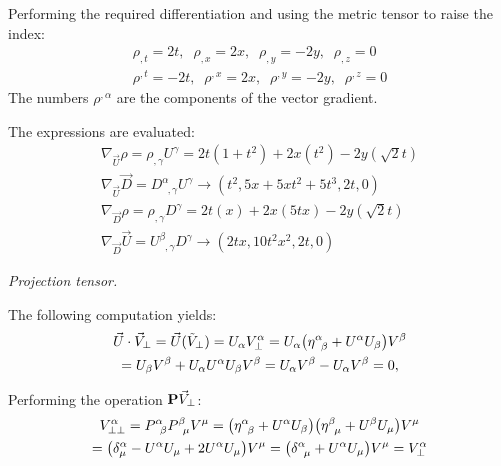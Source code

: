\documentclass{report}
\begin{document}
\begin{subquests}
\begin{subquests}
		\item

		\item		
		Performing the required differentiation and using the metric tensor to raise the index:
		\begin{gather*}
			\rho_{,t} = 2t, \;\; \rho_{,x} = 2x, \;\; \rho_{,y} = -2y, \;\; \rho_{,z} = 0 \\
			\rho^{,t} = -2t, \;\; \rho^{,x} = 2x, \;\; \rho^{,y} = -2y, \;\; \rho^{,z} = 0
		\end{gather*}
		The numbers $\rho^{,\alpha}$ are the components of the vector gradient. 

		\item		
		The expressions are evaluated:
		\begin{gather*}
			\nabla_{\vec U }\rho = \rho_{,\gamma}U^{\gamma} = 2t(1+t^2) + 2x(t^2) - 2y(\sqrt{2}t) \\
			\nabla_{\vec U}\vec{D} = D^{\alpha}_{\;\;,\gamma}U^{\gamma} \longrightarrow (t^2, 5x + 5xt^2 + 5t^3, 2t, 0)\\
			\nabla_{\vec D}\rho = \rho_{,\gamma}D^{\gamma} = 2t(x) + 2x(5tx) - 2y(\sqrt{2}t)\\
			\nabla_{\vec D}\vec{U} = U^{\beta}_{\;\;,\gamma}D^{\gamma} \longrightarrow (2tx, 10 t^2 x^2, 2t, 0)
		\end{gather*}
	
	\end{subquests}

	\item \emph{Projection tensor.}
	\begin{subquests}
		\item
		\begin{subquests}
			\item
			The following computation yields:
			\begin{gather*}
				\vec{U}\cdot\vec{V}_{\perp} = \vec{U}(\tilde{V}_{\perp}) = U_{\alpha} V^{\alpha}_{\perp} = U_{\alpha}\pqty{\eta^{\alpha}_{\;\;\beta} + U^{\alpha} U_{\beta}}V^{\beta} \\
				= U_{\beta} V^{\beta} + U_{\alpha} U^{\alpha} U_{\beta} V^{\beta} = U_{\alpha} V^{\beta} - U_{\alpha} V^{\beta} = 0,
			\end{gather*}
			
			\item
			Performing the operation ${\vb P}\vec{V}_{\perp}$:
			\begin{gather*}
				V^{\alpha}_{\perp\perp} = P^{\alpha}_{\;\;\beta} P^{\beta}_{\;\;\mu} V^{\mu} = \pqty{\eta^{\alpha}_{\;\;\beta} + U^{\alpha}U_{\beta}}\pqty{\eta^{\beta}_{\;\;\mu} + U^{\beta}U_{\mu}}V^{\mu}\\ = \pqty{\delta^{\alpha}_{\mu} - U^{\alpha} U_{\mu} + 2U^{\alpha} U_{\mu}}V^{\mu}  
				= \pqty{\delta^{\alpha}_{\;\;\mu} + U^{\alpha} U_{\mu}}V^{\mu} = V^{\alpha}_{\perp}	
			\end{gather*}
		\end{subquests}


\end{subquests}
\end{subquests}
\end{document}
